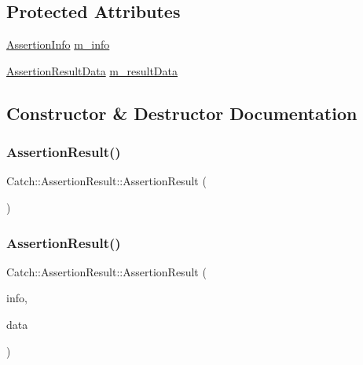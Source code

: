 \subsection*{Protected Attributes}
\begin{DoxyCompactItemize}
\item 
\hyperlink{struct_catch_1_1_assertion_info}{Assertion\+Info} \hyperlink{class_catch_1_1_assertion_result_a3e7236f73a51d6fc8bb9dfdefcee7772}{m\+\_\+info}
\item 
\hyperlink{struct_catch_1_1_assertion_result_data}{Assertion\+Result\+Data} \hyperlink{class_catch_1_1_assertion_result_add3455b8bbedb0d643e18da67c66b4f7}{m\+\_\+result\+Data}
\end{DoxyCompactItemize}


\subsection{Constructor \& Destructor Documentation}
\hypertarget{class_catch_1_1_assertion_result_a570b999c5f66e33cb31d3adb29fec25b}{}\label{class_catch_1_1_assertion_result_a570b999c5f66e33cb31d3adb29fec25b} 
\subsubsection{\texorpdfstring{Assertion\+Result()}{AssertionResult()}\hspace{0.1cm}{\footnotesize\ttfamily [1/2]}}
{\footnotesize\ttfamily Catch\+::\+Assertion\+Result\+::\+Assertion\+Result (\begin{DoxyParamCaption}{ }\end{DoxyParamCaption})}

\hypertarget{class_catch_1_1_assertion_result_ab58aeec27052ba400633ed0e36cea692}{}\label{class_catch_1_1_assertion_result_ab58aeec27052ba400633ed0e36cea692} 
\subsubsection{\texorpdfstring{Assertion\+Result()}{AssertionResult()}\hspace{0.1cm}{\footnotesize\ttfamily [2/2]}}
{\footnotesize\ttfamily Catch\+::\+Assertion\+Result\+::\+Assertion\+Result (\begin{DoxyParamCaption}\item[{\hyperlink{struct_catch_1_1_assertion_info}{Assertion\+Info} const \&}]{info,  }\item[{\hyperlink{struct_catch_1_1_assertion_result_data}{Assertion\+Result\+Data} const \&}]{data }\end{DoxyParamCaption})}


